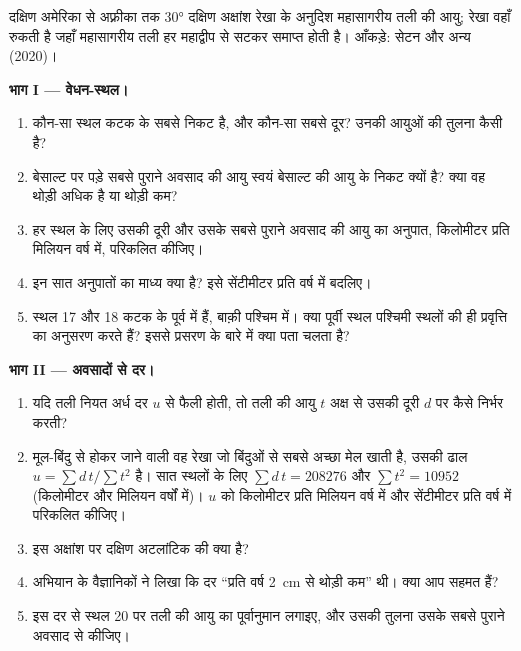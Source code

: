 \begin{problem}[{सप्ताहांत समस्या --- तीन ढंगों से एक महासागर का काल-निर्धारण}]
\begin{center}
{\small दक्षिण अमेरिका से अफ़्रीका तक \ang{30} दक्षिण अक्षांश रेखा के अनुदिश महासागरीय तली की
आयु; रेखा वहाँ रुकती है जहाँ महासागरीय तली हर
महाद्वीप से सटकर समाप्त होती है। आँकड़े: सेटन और अन्य (2020)।}
\end{center}

\medskip
\noindent\textbf{भाग I --- वेधन-स्थल।}
\begin{enumerate}
  \item कौन-सा स्थल कटक के सबसे निकट है, और कौन-सा सबसे दूर? उनकी
        आयुओं की तुलना कैसी है?
  \item बेसाल्ट पर पड़े सबसे पुराने अवसाद की आयु स्वयं बेसाल्ट की आयु के
        निकट क्यों है? क्या वह थोड़ी अधिक है या थोड़ी
        कम?
  \item हर स्थल के लिए उसकी दूरी और उसके सबसे पुराने अवसाद की आयु का अनुपात,
        किलोमीटर प्रति मिलियन वर्ष में, परिकलित कीजिए।
  \item इन सात अनुपातों का माध्य क्या है? इसे सेंटीमीटर प्रति
        वर्ष में बदलिए।
  \item स्थल 17 और 18 कटक के पूर्व में हैं, बाक़ी पश्चिम में। क्या
        पूर्वी स्थल पश्चिमी स्थलों की ही प्रवृत्ति का अनुसरण करते हैं? इससे
        प्रसरण के बारे में क्या पता चलता है?
\end{enumerate}

\medskip
\noindent\textbf{भाग II --- अवसादों से दर।}
\begin{enumerate}[resume]
  \item यदि तली नियत अर्ध दर $u$ से फैली होती, तो तली की आयु
        $t$ अक्ष से उसकी दूरी $d$ पर कैसे निर्भर करती?
  \item मूल-बिंदु से होकर जाने वाली वह रेखा जो बिंदुओं से सबसे अच्छा मेल खाती है, उसकी ढाल
        $u = \sum d\,t / \sum t^2$ है। सात स्थलों के लिए
        $\sum d\,t = \num{208276}$ और $\sum t^2 = \num{10952}$ (किलोमीटर
        और मिलियन वर्षों में)। $u$ को किलोमीटर प्रति
        मिलियन वर्ष में और सेंटीमीटर प्रति वर्ष में परिकलित कीजिए।
  \item इस अक्षांश पर दक्षिण अटलांटिक की  क्या है?
  \item अभियान के वैज्ञानिकों ने लिखा कि दर ``प्रति वर्ष \qty{2}{cm} से
        थोड़ी कम'' थी। क्या आप सहमत हैं?
  \item इस दर से स्थल 20 पर तली की आयु का पूर्वानुमान लगाइए, और उसकी तुलना
        उसके सबसे पुराने अवसाद से कीजिए।
\end{enumerate}


\end{problem}
